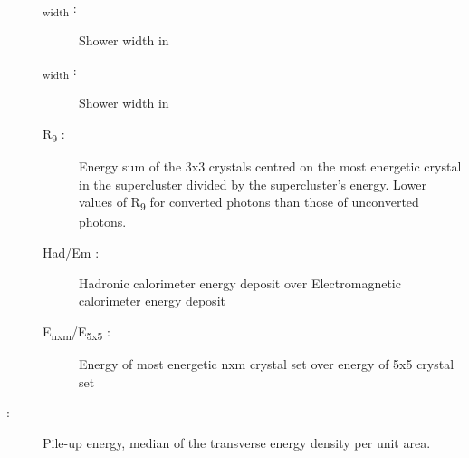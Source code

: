 \begin{description}
\begin{description}
    \\
		\item [\texteta\textsubscript{width} \: \textgamma :] Shower width in \texteta
    \item [\textphi\textsubscript{width} \: \textgamma :] Shower width in \textphi
	\item [R\textsubscript{9} \: \textgamma :] Energy sum of the 3x3 crystals centred on the most energetic crystal in
    the supercluster divided by the supercluster's energy. Lower values of R\textsubscript{9} for converted photons than those of unconverted photons.
	\item [Had/Em :] Hadronic calorimeter energy deposit over Electromagnetic calorimeter energy deposit
    \item [E\textsubscript{nxm}/E\textsubscript{5x5} :] Energy of most energetic nxm crystal set over energy of 5x5 crystal set
    \end{description}
    \item [\textrho :] Pile-up energy, median of the transverse energy density per unit area.
\end{description}

